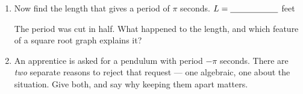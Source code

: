 \documentclass[10pt]{article}
\begin{document}
\begin{tcolorbox}[colback=white, colframe=black!40, title=\textbf{Tier E --- Extension},
    fonttitle=\bfseries, arc=1.5mm, left=3mm, right=3mm, top=2mm, bottom=2mm, breakable]
\begin{enumerate}[label=(\alph*), leftmargin=1.9em, itemsep=6pt, start=7]
        $L=\blank{2.0cm}$ feet
  \item Now find the length that gives a period of $\pi$ seconds. \; $L=\blank{2.0cm}$ feet
        \vspace{0.45in}

        The period was cut in half. What happened to the length, and which feature of a square root
        graph explains it? 
  \item An apprentice is asked for a pendulum with period $-\pi$ seconds. There are \emph{two}
        separate reasons to reject that request --- one algebraic, one about the situation. Give
        both, and say why keeping them apart matters. 
\end{enumerate}
\end{tcolorbox}
\end{document}
